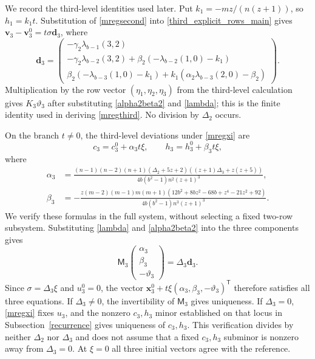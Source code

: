 \documentclass[10pt,a4paper]{amsart}
\begin{document}
We record the third-level identities used later.  Put
$k_1=-mz/(n(z+1))$, so $h_1=k_1t$.  Substitution of
\eqref{mregsecond} into \eqref{third_explicit_rows_main} gives
$\mathbf v_3-\mathbf v_3^0=t\sigma\mathbf d_3$, where
\[
\mathbf d_3=
\begin{pmatrix}
 -\gamma_2\lambda_{b-1}(3,2)\\
 -\gamma_2\lambda_{b-2}(3,2)
       +\beta_2(-\lambda_{b-2}(1,0)-k_1)\\
 \beta_2(-\lambda_{b-3}(1,0)-k_1)
       +k_1(\alpha_2\lambda_{b-3}(2,0)-\beta_2)
\end{pmatrix}.
\]
Multiplication by the row vector $(\eta_1,\eta_2,\eta_3)$ from the
third-level calculation gives $K_3\vartheta_3$ after substituting
\eqref{alpha2beta2} and \eqref{lambda}; this is the finite identity used
in deriving \eqref{mregthird}.  No division by $\Delta_2$ occurs.

On the branch $t\ne0$, the third-level deviations under
\eqref{mregxi} are
\begin{equation}\label{c3h3regular}
 c_3=c_3^0+\alpha_3t\xi,\qquad
 h_3=h_3^0+\beta_3t\xi,
\end{equation}
where
\begin{equation}\label{alpha3beta3}
\begin{aligned}
 \alpha_3&=\frac{(n-1)(n-2)(n+1)(\Delta_2+5z+2)
                   ((z+1)\Delta_3+z(z+5))}
                   {4b(b^2-1)n^2(z+1)^3},\\
 \beta_3&=-\frac{z(m-2)(m-1)m(m+1)
             (12b^2+8bz^2-68b+z^4-21z^2+92)}
             {4b(b^2-1)n^3(z+1)^3}.
\end{aligned}
\end{equation}
We verify these formulas in the full system, without selecting a fixed
two-row subsystem.  Substituting \eqref{lambda} and
\eqref{alpha2beta2} into the three components gives
\begin{equation*}
 \mathsf M_3
 \begin{pmatrix}\alpha_3\\\beta_3\\-\vartheta_3\end{pmatrix}
 =\Delta_3\mathbf d_3.
\end{equation*}
Since $\sigma=\Delta_3\xi$ and $u_3^0=0$, the vector
$\mathbf x_3^0+t\xi(\alpha_3,\beta_3,-\vartheta_3)^{\mathsf T}$
therefore satisfies all three equations.  If $\Delta_3\ne0$, the
invertibility of $\mathsf M_3$ gives uniqueness.  If $\Delta_3=0$,
\eqref{mregxi} fixes $u_3$, and the nonzero $c_3,h_3$ minor established
on that locus in Subsection~\ref{recurrence} gives uniqueness of
$c_3,h_3$.  This verification divides by neither $\Delta_2$ nor $\Delta_3$ and
does not assume that a fixed $c_3,h_3$ subminor is nonzero away from
$\Delta_3=0$.  At $\xi=0$ all three initial vectors agree with the reference.
\end{document}
